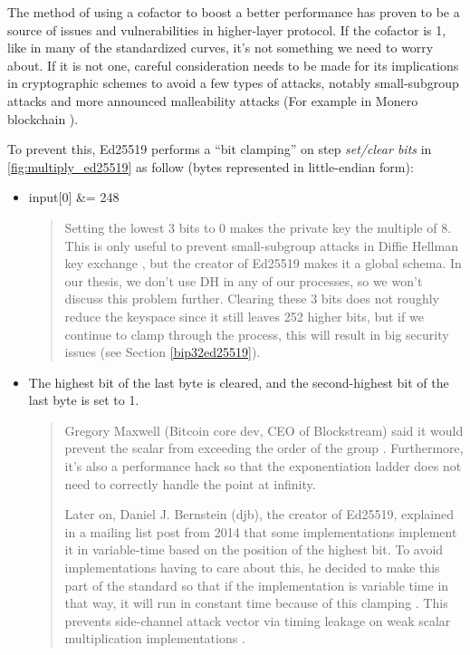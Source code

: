 \begin{adjustwidth}{1cm}{}
    The method of using a cofactor to boost a better performance \cite{DBLP:journals/iacr/BernsteinL17} has proven to be a source of issues and vulnerabilities in higher-layer protocol. If the cofactor is 1, like in many of the standardized curves, it’s not something we need to worry about. If it is not one, careful consideration needs to be made for its implications in cryptographic schemes to avoid a few types of attacks, notably small-subgroup attacks \cite{DBLP:journals/rfc/rfc2785} and more announced malleability attacks (For example in Monero blockchain \cite{Riccardo}).

    To prevent this, Ed25519 performs a “bit clamping” on step \textit{set/clear bits} in \autoref{fig:multiply_ed25519} as follow (bytes represented in little-endian form):

    \begin{itemize}
        \item input[0] \&= 248
              \begin{quote}
                  Setting the lowest 3 bits to 0 makes the private key the multiple of 8. This is only useful to prevent small-subgroup attacks in Diffie Hellman key exchange \cite{enwiki:1057850165}, but the creator of Ed25519 makes it a global schema. In our thesis, we don't use DH in any of our processes, so we won't discuss this problem further. Clearing these 3 bits does not roughly reduce the keyspace since it still leaves 252 higher bits, but if we continue to clamp through the process, this will result in big security issues (see Section \ref{bip32ed25519}).

              \end{quote}

              \bigskip

        \item The highest bit of the last byte is cleared, and the second-highest bit of the last byte is set to 1.
              \begin{quote}

                  Gregory Maxwell (Bitcoin core dev, CEO of Blockstream) said it would prevent the scalar from exceeding the order of the group \cite{mail:000860}. Furthermore, it's also a performance hack so that the exponentiation ladder does not need to correctly handle the point at infinity.

                  Later on, Daniel J. Bernstein (djb), the creator of Ed25519, explained in a mailing list post from 2014 that some implementations implement it in variable-time based on the position of the highest bit. To avoid implementations having to care about this, he decided to make this part of the standard so that if the implementation is variable time in that way, it will run in constant time because of this clamping \cite{Bernstein:2014}. This prevents side-channel attack vector via timing leakage on weak scalar multiplication implementations \cite{DBLP:journals/iacr/BrumleyT11}.


\end{quote}
\end{itemize}
\end{adjustwidth}
